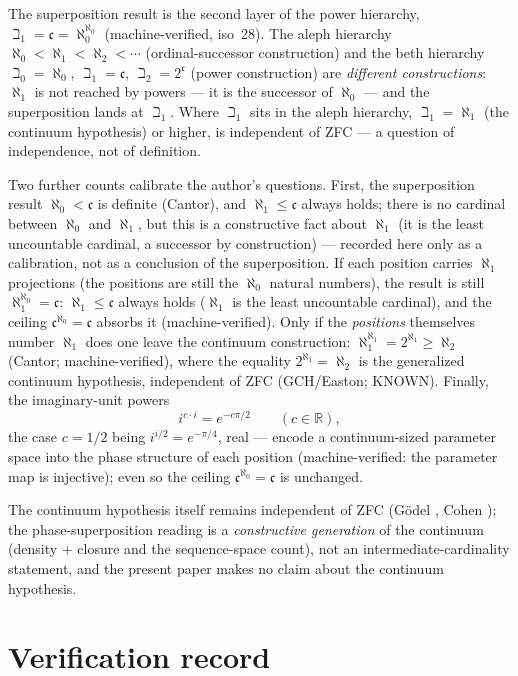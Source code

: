 \documentclass{article}
\begin{document}
The superposition result is the second layer of the power hierarchy,
$\beth_1=\mathfrak c=\aleph_0^{\aleph_0}$ (machine-verified, iso~28). The
aleph hierarchy $\aleph_0<\aleph_1<\aleph_2<\cdots$ (ordinal-successor
construction) and the beth hierarchy $\beth_0=\aleph_0$,
$\beth_1=\mathfrak c$, $\beth_2=2^{\mathfrak c}$ (power construction) are
\emph{different constructions}: $\aleph_1$ is not reached by powers ---
it is the successor of $\aleph_0$ --- and the superposition lands at
$\beth_1$. Where $\beth_1$ sits in the aleph hierarchy,
$\beth_1=\aleph_1$ (the continuum hypothesis) or higher, is independent of
ZFC --- a question of independence, not of definition.

Two further counts calibrate the author's questions. First, the
superposition result $\aleph_0<\mathfrak c$ is definite (Cantor), and
$\aleph_1\le\mathfrak c$ always holds; there is no cardinal between
$\aleph_0$ and $\aleph_1$, but this is a constructive fact about
$\aleph_1$ (it is the least uncountable cardinal, a successor by
construction) --- recorded here only as a calibration, not as a
conclusion of the superposition. If each position
carries $\aleph_1$ projections (the positions are still the $\aleph_0$
natural numbers), the result is still
$\aleph_1^{\aleph_0}=\mathfrak c$: $\aleph_1\le\mathfrak c$ always holds
($\aleph_1$ is the least uncountable cardinal), and the ceiling
$\mathfrak c^{\aleph_0}=\mathfrak c$ absorbs it (machine-verified).
Only if the \emph{positions} themselves number $\aleph_1$ does one leave
the continuum construction: $\aleph_1^{\aleph_1}=2^{\aleph_1}\ge\aleph_2$
(Cantor; machine-verified), where the equality $2^{\aleph_1}=\aleph_2$ is
the generalized continuum hypothesis, independent of ZFC
(GCH/Easton; KNOWN). Finally, the imaginary-unit powers
\[
i^{c\cdot i}=e^{-c\pi/2}\qquad(c\in\mathbb{R}),
\]
the case $c=1/2$ being $i^{i/2}=e^{-\pi/4}$, real --- encode a
continuum-sized parameter space into the phase structure of each
position (machine-verified: the parameter map is injective); even so
the ceiling $\mathfrak c^{\aleph_0}=\mathfrak c$ is unchanged.

The continuum hypothesis itself remains independent of ZFC (G\"odel
\cite{godel}, Cohen \cite{cohen}); the phase-superposition reading is a
\emph{constructive generation} of the continuum (density + closure and
the sequence-space count), not an intermediate-cardinality statement,
and the present paper makes no claim about the continuum hypothesis.

\section{Verification record}
\label{sec:verification}
\end{document}
